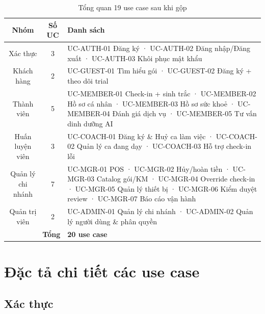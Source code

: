 \begin{table}[h]
\centering
\renewcommand{\arraystretch}{1.3}
\begin{tabular}{|c|c|p{10cm}|}
\hline
\textbf{Nhóm} & \textbf{Số UC} & \textbf{Danh sách} \\ \hline
Xác thực & 3 & UC-AUTH-01 Đăng ký · UC-AUTH-02 Đăng nhập/Đăng xuất · UC-AUTH-03 Khôi phục mật khẩu \\ \hline
Khách hàng & 2 & UC-GUEST-01 Tìm hiểu gói · UC-GUEST-02 Đăng ký + theo dõi trial \\ \hline
Thành viên & 5 & UC-MEMBER-01 Check-in + sinh trắc · UC-MEMBER-02 Hồ sơ cá nhân · UC-MEMBER-03 Hồ sơ sức khoẻ · UC-MEMBER-04 Đánh giá dịch vụ · UC-MEMBER-05 Tư vấn dinh dưỡng AI \\ \hline
Huấn luyện viên & 3 & UC-COACH-01 Đăng ký \& Huỷ ca làm việc · UC-COACH-02 Quản lý ca đang dạy · UC-COACH-03 Hỗ trợ check-in lỗi \\ \hline
Quản lý chi nhánh & 7 & UC-MGR-01 POS · UC-MGR-02 Hủy/hoàn tiền · UC-MGR-03 Catalog gói/KM · UC-MGR-04 Override check-in · UC-MGR-05 Quản lý thiết bị · UC-MGR-06 Kiểm duyệt review · UC-MGR-07 Báo cáo vận hành \\ \hline
Quản trị viên & 2 & UC-ADMIN-01 Quản lý chi nhánh · UC-ADMIN-02 Quản lý người dùng \& phân quyền \\ \hline
\multicolumn{2}{|r|}{\textbf{Tổng}} & \textbf{20 use case} \\ \hline
\end{tabular}
\caption{Tổng quan 19 use case sau khi gộp}
\end{table}

\newpage
\section{Đặc tả chi tiết các use case}

\subsection{Xác thực}

